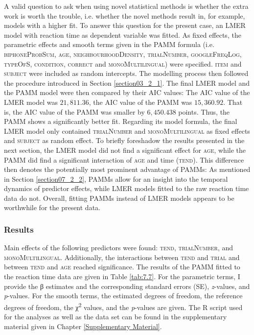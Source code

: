 A valid question to ask when using novel statistical methods is whether the extra work is worth the trouble, i.e. whether the novel methods result in, for example, models with a higher fit. To answer this question for the present case, an LMER model with reaction time as dependent variable was fitted. As fixed effects, the parametric effects and smooth terms given in the PAMM formula (i.e. \textsc{biphoneProbSum, age, neighbourhoodDensity, trialNumber, googleFreqLog, typeOfS, condition, correct} and \textsc{monoMultilingual}) were specified. \textsc{item} and \textsc{subject} were included as random intercepts. The modelling process then followed the procedure introduced in Section \ref{section03_2_1}. The final LMER model and the PAMM model were then compared by their AIC values: The AIC value of the LMER model was $21,811.36$, the AIC value of the PAMM was $15,360.92$. That is, the AIC value of the PAMM was smaller by $6,450.438$ points. Thus, the PAMM shows a significantly better fit. Regarding its model formula, the final LMER model only contained \textsc{trialNumber} and \textsc{monoMultilingual} as fixed effects and \textsc{subject} as random effect. To briefly foreshadow the results presented in the next section, the LMER model did not find a significant effect for \textsc{age}, while the PAMM did find a significant interaction of \textsc{age} and time (\textsc{tend}). This difference then denotes the potentially most prominent advantage of PAMMs: As mentioned in Section \ref{section07_2_2}, PAMMs allow for an insight into the temporal dynamics of predictor effects, while LMER models fitted to the raw reaction time data do not. Overall, fitting PAMMs instead of LMER models appears to be worthwhile for the present data.

\subsubsection{Results}\label{section07_2_2_3}

Main effects of the following predictors were found: \textsc{tend}, \textsc{trialNumber}, and \textsc{monoMultilingual}. Additionally, the interactions between \textsc{tend} and \textsc{trial} and between \textsc{tend} and \textsc{age} reached significance. The results of the PAMM fitted to the reaction time data are given in Table \ref{tab:7.7}. For the parametric terms, I provide the β estimates and the corresponding standard errors (SE), \textit{z}-values, and \textit{p}-values. For the smooth terms, the estimated degrees of freedom, the reference degrees of freedom, the χ\textsuperscript{2} values, and the \textit{p}-values are given. The R script used for the analyses as well as the data set can be found in the supplementary material given in Chapter \ref{Supplementary Material}.

